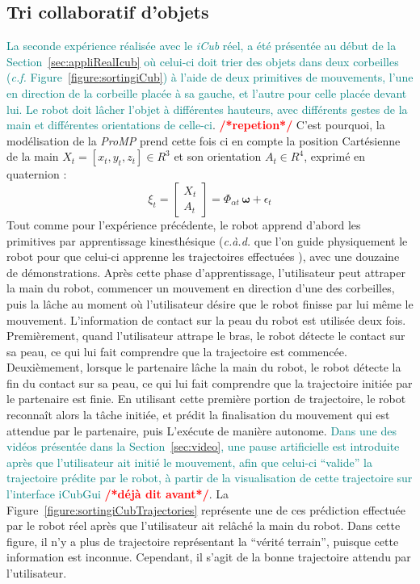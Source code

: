 \documentclass[utf8]{frontiersSCNS} %
\newcommand{\toimprove}[1]{\textcolor{teal}{#1}}
\newcommand{\todo}[1]{\textcolor{red}{\textbf{/*#1*/}}}
\begin{document}
\subsection{Tri collaboratif d'objets}

\toimprove{La seconde expérience réalisée avec le \textit{iCub} réel, a été présentée au début de la Section~\ref{sec:appliRealIcub} où celui-ci doit trier des objets dans deux corbeilles (\textit{c.f.} Figure~\ref{figure:sortingiCub}) à l'aide de deux primitives de mouvements, l'une en direction de la corbeille placée à sa gauche, et l'autre pour celle placée devant lui. Le robot doit lâcher l'objet à différentes hauteurs, avec différents gestes de la main et différentes orientations de celle-ci}. \todo{repetion}
C'est pourquoi, la modélisation de la \textit{ProMP} prend cette fois ci en compte la position Cartésienne de la main $X_t=[x_t,y_t,z_t] \in R^3$ et son orientation $A_t \in R^4$, exprimé en quaternion :
$$\xi_t = \begin{bmatrix} X_t \\ A_t\end{bmatrix} = \Phi_{\alpha t} \, \boldsymbol{\omega} + \epsilon_t$$
Tout comme pour l'expérience précédente, le robot apprend d'abord les primitives par apprentissage kinesthésique (\textit{c.à.d.} que l'on guide physiquement le robot pour que celui-ci apprenne les trajectoires effectuées ), avec une douzaine de démonstrations. Après cette phase d'apprentissage, l'utilisateur peut attraper la main du robot, commencer un mouvement en direction d'une des corbeilles, puis la lâche au moment où l'utilisateur désire que le robot finisse par lui même le mouvement. L'information de  contact sur la peau du robot est utilisée deux fois. Premièrement, quand l'utilisateur attrape le bras, le robot détecte le contact sur sa peau, ce qui lui fait comprendre que la trajectoire est commencée.  Deuxièmement, lorsque le partenaire lâche la main du robot, le robot détecte la fin du contact sur sa peau, ce qui lui fait comprendre que la trajectoire initiée par le partenaire est finie. 
En utilisant cette première portion de trajectoire, le robot reconnaît alors la tâche initiée, et prédit la finalisation du mouvement qui est attendue par le partenaire, puis L’exécute de manière autonome. 
\toimprove{Dans une des vidéos présentée dans la Section~\ref{sec:video}, une pause artificielle est introduite après que l'utilisateur ait initié le mouvement, afin que celui-ci ``valide'' la trajectoire prédite par le robot, à partir de la visualisation de cette trajectoire sur l'interface iCubGui \todo{déjà dit avant}}. 
La Figure~\ref{figure:sortingiCubTrajectories} représente une de ces prédiction effectuée par le robot réel après que l'utilisateur ait relâché la main du robot. Dans cette figure, il n'y a plus de trajectoire représentant la ``vérité terrain'', puisque cette information est inconnue. Cependant, il s'agit de la bonne trajectoire attendu par l'utilisateur.
\end{document}
